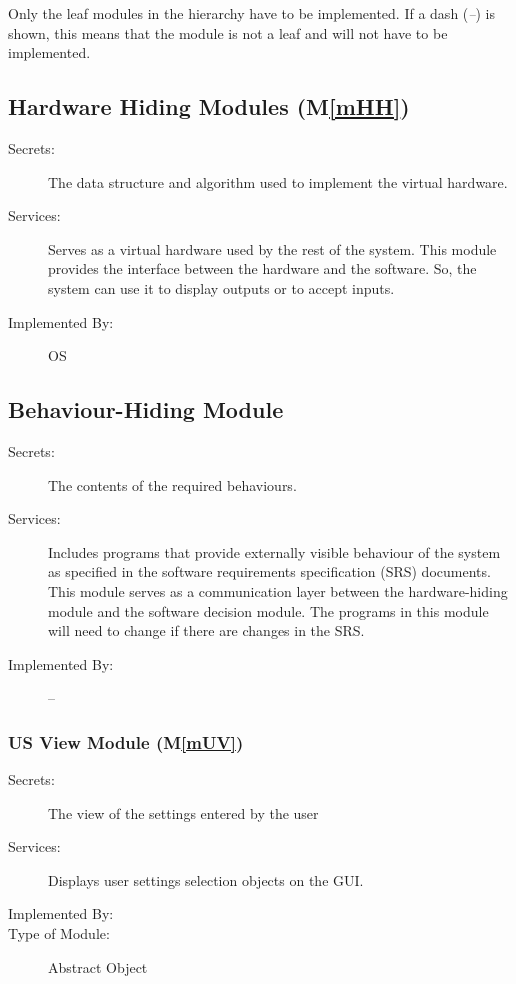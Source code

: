 \documentclass[12pt, titlepage]{article}
\newcommand{\mref}[1]{M\ref{#1}}
\begin{document}
Only the leaf modules in the hierarchy have to be implemented. If a dash
(\emph{--}) is shown, this means that the module is not a leaf and will not have
to be implemented.

\subsection{Hardware Hiding Modules (\mref{mHH})}

\begin{description}
\item[Secrets:]The data structure and algorithm used to implement the virtual
  hardware.
\item[Services:]Serves as a virtual hardware used by the rest of the
  system. This module provides the interface between the hardware and the
  software. So, the system can use it to display outputs or to accept inputs.
\item[Implemented By:] OS
\end{description}

\subsection{Behaviour-Hiding Module}

\begin{description}
\item[Secrets:]The contents of the required behaviours.
\item[Services:]Includes programs that provide externally visible behaviour of
  the system as specified in the software requirements specification (SRS)
  documents. This module serves as a communication layer between the
  hardware-hiding module and the software decision module. The programs in this
  module will need to change if there are changes in the SRS.
\item[Implemented By:] --
\end{description}

\subsubsection{US View Module (\mref{mUV})}

\begin{description}
\item[Secrets:]The view of the settings entered by the user
\item[Services:]Displays user settings selection objects on the GUI.
\item[Implemented By:] \progname
\item[Type of Module:] Abstract Object
\end{description}
\end{document}
